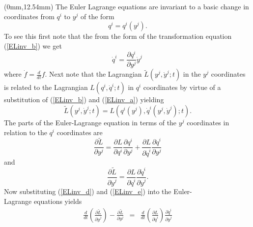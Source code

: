 \documentclass[10pt]{article}
\begin{document}
\scriptsize
{}
\begin{textblock*}{65mm}(0mm,12.54mm)
The Euler Lagrange equations are invariant to a basic change in coordinates from $q^i$ to
$y^j$ of the form 
\begin{equation}\label{ELinv_b}
  q^i = q^i \left(y^j \right) .
\end{equation}
To see this first note that the from the 
form of the transformation equation (\ref{ELinv_b}) we get
\begin{equation}\label{ELinv_a}
  {\dot q}^i = \frac{\partial q^i}{\partial y^j} {\dot y}^j \,
\end{equation}
where $\dot f = \frac{d}{dt} f$. Next note that the Lagrangian 
$\tilde L \left(y^j,{\dot y}^j;t \right)$ in the $y^j$ coordinates 
is related to the Lagrangian $L \left(q^i,{\dot q}^i;t \right)$ 
in $q^i$ coordinates by virtue of a substitution of (\ref{ELinv_b}) 
and (\ref{ELinv_a}) yielding
\begin{equation}\label{ELinv_c}
  \tilde L \left(y^j,{\dot y}^j;t \right) = L \left(q^i(y^j),{\dot q}^i(y^j,{\dot y}^j);t \right) .
\end{equation}
The parts of the Euler-Lagrange equation in terms
of the $y^j$ coordinates in relation to the $q^i$ coordinates are
\begin{equation}\label{ELinv_d}
  \frac{\partial \tilde L}{\partial y^j} =    \frac{\partial L}{\partial q^i}        \frac{\partial q^i}{\partial y^j} 
                                        +  \frac{\partial L}{\partial {\dot q}^i} \frac{\partial {\dot q}^i}{\partial y^j}
\end{equation}
and
\begin{equation}\label{ELinv_e}
  \frac{\partial \tilde L}{\partial {\dot y}^j} = \frac{\partial L}{\partial {\dot q}^i} \frac{\partial {\dot q}^i}{\partial {\dot y}^j} .
\end{equation}
Now substituting (\ref{ELinv_d}) and (\ref{ELinv_e}) into the Euler-\\Lagrange equations
yields
\begin{eqnarray}\label{ELinv_f}
  \frac{d}{dt} \left( \frac{\partial \tilde L}{\partial {\dot y}^j } \right) - \frac{\partial \tilde L}{\partial y^j} 
    & = &   \frac{d}{d t} \left( \frac{\partial L}{\partial {\dot q}^i} \right) \frac{\partial {\dot q}^i}{\partial {\dot y}^j} \\ \nonumber

\end{eqnarray}
\end{textblock*}
\end{document}
